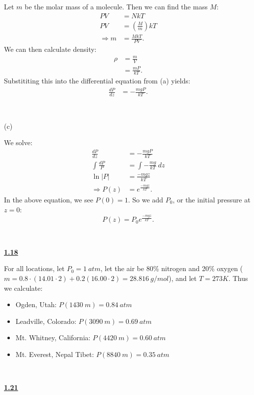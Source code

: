 \documentclass{article}
\begin{document}
Let $m$ be the molar mass of a molecule. Then we can find the mass $M$:
\begin{align*}
PV & =NkT\\
PV & =\left(\frac{M}{m}\right) kT\\
\Rightarrow m & =\frac{MkT}{PV} .
\end{align*}
We can then calculate density:
\begin{align*}
\rho  & =\frac{m}{V}\\
 & =\frac{mP}{kT} .
\end{align*}
Substititing this into the differential equation from (a) yields:
\begin{align*}
\frac{dP}{dz} & =-\frac{mgP}{kT} .
\end{align*}


\

(c)

We solve:
\begin{align*}
\frac{dP}{dz} & =-\frac{mgP}{kT}\\
\int \frac{dP}{P} & =\int -\frac{mg}{kT} \ dz\\
\ln |P| & =\frac{-mgz}{kT}\\
\Rightarrow P( z) & =e^{\frac{-mgz}{kT}} .
\end{align*}
In the above equation, we see $P( 0) =1$. So we add $P_{0}$, or the initial pressure at $z=0$:
\begin{equation*}
\boxed{P( z) =P_{0} e^{\frac{-mgz}{kT}} .}
\end{equation*}


\

\hline

\textbf{\underline{1.18}}

For all locations, let $P_{0} =1\ atm$, let the air be 80\% nitrogen and 20\% oxygen ($m=0.8\cdot ( 14.01\cdot 2) +0.2( 16.00\cdot 2) =28.816\ g/mol$), and let $T=273K$. Thus we calculate:
\begin{itemize}
\item Ogden, Utah: $P( 1430\ m) =0.84\ atm$
\item Leadville, Colorado: $P( 3090\ m) =0.69\ atm$
\item Mt. Whitney, California: $P( 4420\ m) =0.60\ atm$
\item Mt. Everest, Nepal Tibet: $P( 8840\ m) =0.35\ atm$
\end{itemize}



\

\hline

\textbf{\underline{1.21}}
\end{document}
